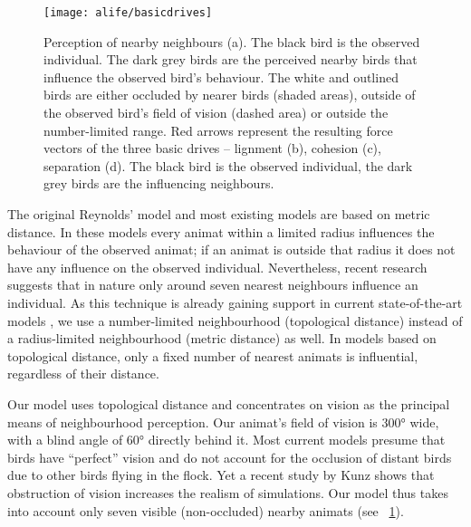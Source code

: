 \begin{figure}
	\texttt{[image: alife/basicdrives]}
	\caption{Perception of nearby neighbours (a). The black bird is the observed individual. The dark grey birds are the perceived nearby birds that influence the observed bird's behaviour. The white and outlined birds are either occluded by nearer birds (shaded areas), outside of the observed bird's field of vision (dashed area) or outside the number-limited range. Red arrows represent the resulting force vectors of the three basic drives -- lignment (b), cohesion (c), separation (d). The black bird is the observed individual, the dark grey birds are the influencing neighbours.}
	\label{figDrives}
\end{figure}

The original Reynolds' model and most existing models are based on metric distance. In these models every animat within a limited radius influences the behaviour of the observed animat; if an animat is outside that radius it does not have any influence on the observed individual. Nevertheless, recent research \cite{ballerini2008interaction,ballerini2008empirical} suggests that in nature only around seven nearest neighbours influence an individual. As this technique is already gaining support in current state-of-the-art models \cite{hildenbrandt2010selforganized}, we use a number-limited neighbourhood (topological distance) instead of a radius-limited neighbourhood (metric distance) as well. In models based on topological distance, only a fixed number of nearest animats is influential, regardless of their distance.

Our model uses topological distance and concentrates on vision as the principal means of neighbourhood perception. Our animat's field of vision is \ang{300} wide, with a blind angle of \ang{60} directly behind it. Most current models presume that birds have ``perfect'' vision and do not account for the occlusion of distant birds due to other birds flying in the flock. Yet a recent study by Kunz\etal \cite{kunz2012simulations} shows that obstruction of vision increases the realism of simulations. Our model thus takes into account only seven visible (non-occluded) nearby animats (see \figurename~\ref{figDrives}).

